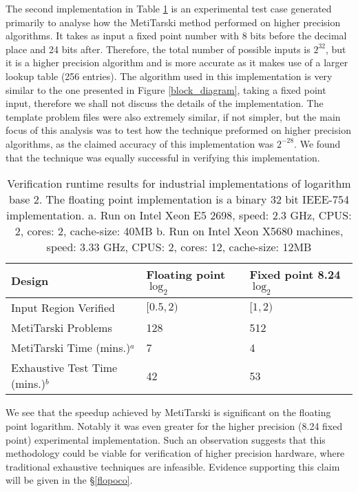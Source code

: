 \documentclass{fac}
\begin{document}
The second implementation in Table \ref{result} is an experimental test case generated primarily to analyse how the MetiTarski method performed on higher precision algorithms. It takes as input a fixed point number with 8 bits before the decimal place and 24 bits after. Therefore, the total number of possible inputs is $2^{32}$, but it is a higher precision algorithm and is more accurate as it makes use of a larger lookup table (256 entries). The algorithm used in this implementation is very similar to the one presented in Figure \ref{block_diagram}, taking a fixed point input, therefore we shall not discuss the details of the implementation. The template problem files were also extremely similar, if not simpler, but the main focus of this analysis was to test how the technique preformed on higher precision algorithms, as the claimed accuracy of this implementation was $2^{-28}$. We found that the technique was equally successful in verifying this implementation. 

\begin{table}
\begin{tabular}{lll}\toprule
Design & Floating point $\log_2$ & Fixed point 8.24 $\log_2$    \\
\midrule
 Input Region Verified& $[0.5,2)$ & $[1,2) $ \\ 
 MetiTarski Problems & 128 & 512 \\
 MetiTarski Time (mins.)$^a$ &  7 & 4 \\ 
 Exhaustive Test Time (mins.)$^b$ & 42 & 53 \\
\bottomrule
\end{tabular}
\caption{Verification runtime results for industrial implementations of logarithm base 2. The floating point implementation is a binary 32 bit IEEE-754 implementation.\newline
a. Run on Intel Xeon E5 2698, speed: 2.3 GHz, CPUS: 2, cores: 2, cache-size: 40MB
\newline
b. Run on Intel Xeon X5680 machines, speed: 3.33 GHz, CPUS: 2, cores: 12, cache-size: 12MB}\label{result}     
\end{table}

We see that the speedup achieved by MetiTarski is significant on the floating point logarithm. Notably it was even greater for the higher precision (8.24 fixed point) experimental implementation. Such an observation suggests that this methodology could be viable for verification of higher precision hardware, where traditional exhaustive techniques are infeasible. Evidence supporting this claim will be given in the \S \ref{flopoco}.
\end{document}
